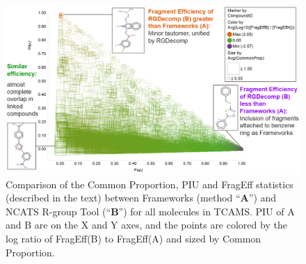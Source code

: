 \documentclass[journal=jacsat,manuscript=article]{achemso}
\begin{document}
\begin{figure}
\includegraphics[width=6in]{fig/statcompare_frames_RGtool_transparent_density.png}
\caption{Comparison of the Common Proportion, PIU and FragEff statistics (described in the text) between Frameworks (method ``{\bf A}'') and NCATS R-group Tool (``{\bf B}'') for all molecules in TCAMS. PIU of A and B are on the X and Y axes, and the points are colored by the log ratio of FragEff(B) to FragEff(A) and sized by Common Proportion.}
\label{fig:statcompare}
\end{figure}
 
\end{document}

